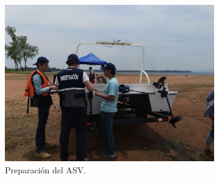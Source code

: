\begin{figure}[H]
     \centering
     \begin{subfigure}[b]{0.65\textwidth}
         \centering
         \includegraphics[width=\textwidth]{Imagenes/cap4/PruebaCampo.jpeg}
         \caption{Preparaci\'on del ASV.}
         \label{fig:PreparacionASV}
     \end{subfigure}
     \hfill
     \begin{subfigure}[b]{0.3\textwidth}
         \centering

\end{subfigure}
\end{figure}

